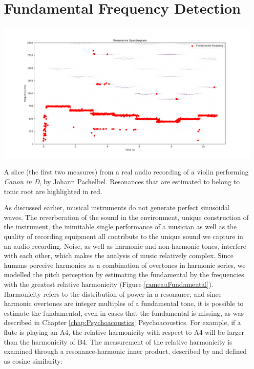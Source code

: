 \section{Fundamental Frequency Detection}
\begin{marginfigure}
\centering
\vspace{3cm}
\includegraphics[width=1\linewidth]{images/cluster/violin_canonD_1_f0.png}
\caption{A slice (the first two measures) from a real audio recording of a violin performing \textit{Canon in D}, by Johann Pachelbel. Resonances that are estimated to belong to tonic root are highlighted in red.}
\label{rameauFundamental} 
\end{marginfigure}
As discussed earlier, musical instruments do not generate perfect sinusoidal waves. The reverberation of the sound in the environment, unique construction of the instrument, the inimitable single performance of a musician as well as the quality of recording equipment all contribute to the unique sound we capture in an audio recording. Noise, as well as harmonic and non-harmonic tones, interfere with each other, which makes the analysis of music relatively complex. 
Since humans perceive harmonics as a combination of overtones in harmonic series, we modelled the pitch perception by estimating the fundamental by the frequencies with the greatest relative harmonicity (Figure \ref{rameauFundamental}). Harmonicity refers to the distribution of power in a resonance, and since harmonic overtones are integer multiples of a fundamental tone, it is possible to estimate the fundamental, even in cases that the fundamental is missing, as was described in Chapter \ref{chap:Psychoacoustics} Psychoacoustics. For example, if a flute is playing an A4, the relative harmonicity with respect to A4 will be larger than the harmonicity of B4. The measurement of the relative harmonicity is examined through a resonance-harmonic inner product, described by \textcite{homer_modelling_2023} and defined as cosine similarity:

